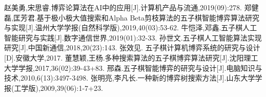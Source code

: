 \documentclass[a4paper]{article}
\begin{document}
\begin{multicols}{2}
\begin{thebibliography}{30}
赵美勇,宋思睿.博弈论算法在AI中的应用[J].计算机产品与流通,2019(09):278.
郑健磊,匡芳君.基于极小极大值搜索和Alpha Beta剪枝算法的五子棋智能博弈算法研究与实现[J].温州大学学报(自然科学版),2019,40(03):53-62.
牛恺泽,邓鑫.五子棋人工智能研究与实践[J].数字通信世界,2019(01):32-33.
孙世文.五子棋人工智能算法实现研究[J].中国新通信,2018,20(23):143.
张效见. 五子棋计算机博弈系统的研究与设计[D].安徽大学,2017.
董慧颖,王杨.多种搜索算法的五子棋博弈算法研究[J].沈阳理工大学学报,2017,36(02):39-43+83.
邢森.五子棋智能博弈的研究与设计[J].电脑知识与技术,2010,6(13):3497-3498.
张明亮,李凡长.一种新的博弈树搜索方法[J].山东大学学报(工学版),2009,39(06):1-7+23.
    \end{thebibliography}
    \newpage
\end{multicols}
\end{document}
